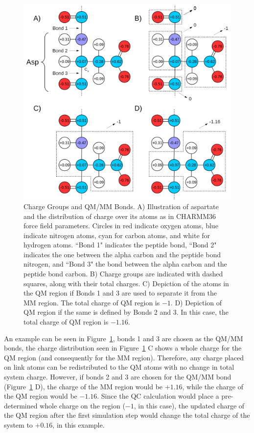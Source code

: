 \begin{figure}[tbp]
\centering
\includegraphics[width=5in]{figures/ChargeGroupDiagram.png}
\caption[Charge Groups and QM/MM Bonds]{%
Charge Groups and QM/MM Bonds.
A) Illustration of aspartate and the distribution of charge over its 
atoms as in CHARMM36 force field parameters. Circles in red indicate 
oxygen atoms, blue indicate nitrogen atoms, cyan for carbon atoms, 
and white for hydrogen atoms. ``Bond 1" indicates the peptide bond,
``Bond 2" indicates the one between the alpha carbon and the peptide bond 
nitrogen, and ``Bond 3" the bond between the alpha carbon and the peptide 
bond carbon. 
B) Charge groups are indicated with dashed squares, 
along with their total charges. 
C) Depiction of the atoms in the QM region if Bonds 1 and 3 are used to 
separate it from the MM region. The total charge of QM region is $-1$. 
D) Depiction of QM region if the same is defined by Bonds 2 and 3. 
In this case, the total charge of QM region is $-1.16$.
}
\label{fig:qmmm_chargegroups}
\end{figure}

An example can be seen in Figure~\ref{fig:qmmm_chargegroups},
bonds 1 and 3 are chosen as the QM/MM bonds,
the charge distribution seen in Figure~\ref{fig:qmmm_chargegroups} C shows 
a whole charge for the QM region (and consequently for the MM region). 
Therefore, any charge placed on link atoms can be redistributed 
to the QM atoms with no change in total system charge. However, 
if bonds 2 and 3 are chosen for the QM/MM bond
(Figure~\ref{fig:qmmm_chargegroups} D), 
the charge of the MM region would be $+1.16$, while the charge 
of the QM region would be $-1.16$. Since the QC calculation would 
place a pre-determined whole charge on the region ($-1$, in this case), 
the updated charge of the QM region after the first simulation step 
would change the total charge of the system to $+0.16$, in this example.


